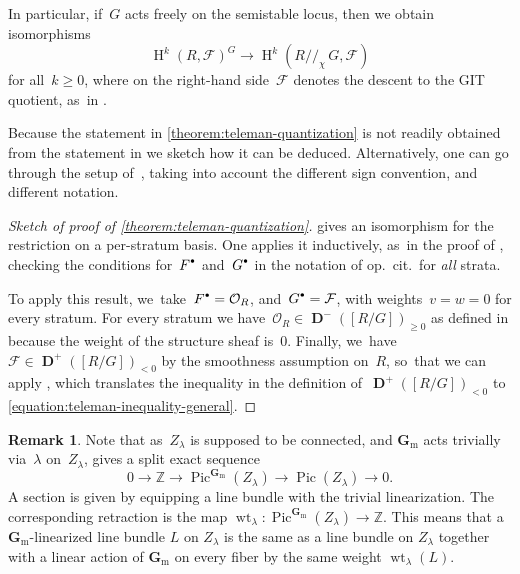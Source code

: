 \documentclass[11pt]{article}
\newcommand{\sbullet}{{\scriptscriptstyle\bullet}}
\newcommand{\csbullet}{{\raisebox{1pt}{$\sbullet$}}}
\theoremstyle{plain}
\theoremstyle{definition}
\newtheorem{remark}[theorem]{Remark}
\DeclareMathOperator\derived{\mathbf{D}}
\DeclareMathOperator\HH{H}
\DeclareMathOperator\weight{wt}
\newcommand\Gm{\ensuremath{\mathbf{G}_{\mathrm{m}}}}
\begin{document}
In particular, if~$G$ acts freely on the semistable locus,
then we obtain isomorphisms
\begin{equation*}
\HH^k(R,\mathcal{F})^G \to \HH^k(R{/\!\!/_\chi}\,G,\mathcal{F})
\end{equation*}
for all~$k\geq 0$,
where on the right-hand side~$\mathcal{F}$ denotes the descent to the GIT quotient, as~in \cite[Th.\,3.2]{MR1792291}.

Because the statement in \cref{theorem:teleman-quantization}
is not readily obtained from the statement in \cite[Th.\,3.29]{MR3327537}
we sketch how it can be deduced.
Alternatively,
one can go through the setup of~\cite[Prop.\,2.11]{MR1792291},
taking into account the different sign convention,
and different notation.
\begin{proof}[Sketch of proof of \cref{theorem:teleman-quantization}]
\cite[Th.\,3.29]{MR3327537} gives an isomorphism for the restriction
on a per-stratum basis.
One applies it inductively, as~in the proof of \cite[Th.\,1.1]{MR3327537},
checking the conditions for~$F^\csbullet$ and~$G^\csbullet$
in the notation of op.~cit.~for \emph{all} strata.

To apply this result, we~take~$F^\csbullet=\mathcal{O}_R$,
and~$G^\csbullet=\mathcal{F}$,
with weights~$v=w=0$ for every stratum.
For every stratum we have~$\mathcal{O}_R\in\derived^-([R/G])_{\geq 0}$
as defined in \cite[Def.\,3.24]{MR3327537}
because the weight of the structure sheaf is~0.
Finally, we~have~$\mathcal{F}\in\derived^+([R/G])_{<0}$
by the smoothness assumption on~$R$, so~that we can apply \cite[Lem.\,2.9]{MR3327537},
which translates the inequality
in the definition of~$\derived^+([R/G])_{<0}$
to \eqref{equation:teleman-inequality-general}.
\end{proof}

\begin{remark}
\label{remark:weights}
Note that as~$Z_\lambda$ is supposed to be connected,
and $\Gm$ acts trivially via~$\lambda$ on~$Z_\lambda$,
\cite[Prop.\,2.10]{MR3329192} gives a split exact sequence
\begin{equation*}
0 \to \mathbb{Z} \to \operatorname{Pic}^{\Gm}(Z_\lambda) \to \operatorname{Pic}(Z_\lambda) \to 0.
\end{equation*}
A section is given by equipping a line bundle with the trivial linearization.
The corresponding retraction is the map $\weight_\lambda\colon \operatorname{Pic}^{\Gm}(Z_\lambda) \to \mathbb{Z}$.
This means that a $\Gm$\nobreakdash-lin\-earized line bundle $L$ on $Z_\lambda$
is the same as a line bundle on $Z_\lambda$ together with
a linear action of $\Gm$ on every fiber by the same weight $\weight_\lambda(L)$.
\end{remark}
\end{document}
